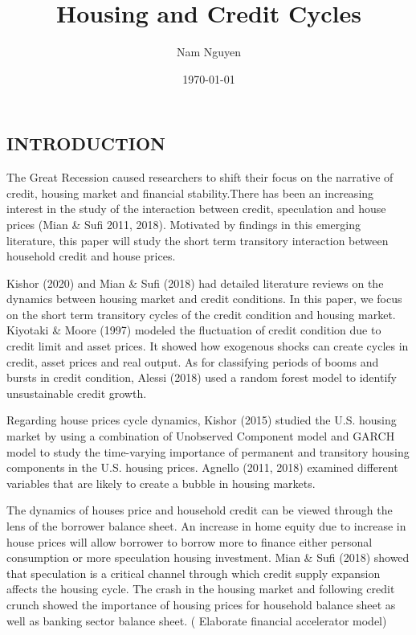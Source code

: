 \documentclass[12pt]{article}
\title{Housing and Credit Cycles}
\author{Nam Nguyen}
\date{\today}
\begin{document}
	\maketitle
	
	\begin{outline}[enumerate]
		
		\section{INTRODUCTION}
	
		The Great Recession caused researchers to shift their focus on the narrative of credit, housing market and financial stability.There has been an increasing interest in the study of the interaction between credit, speculation and house prices (Mian \& Sufi 2011, 2018).  Motivated by findings in this emerging literature, this paper will study the short term transitory interaction between household credit and house prices.
		
		Kishor (2020) and Mian \& Sufi (2018) had detailed literature reviews on the dynamics between housing market and credit conditions. In this paper, we focus on the short term transitory cycles of the credit condition and housing market. Kiyotaki \& Moore (1997) modeled the fluctuation of credit condition due to credit limit and asset prices. It showed how exogenous shocks can create cycles in credit, asset prices and real output. As for classifying periods of booms and bursts in credit condition, Alessi (2018) used a random forest model to identify unsustainable credit growth.
		
		Regarding house prices cycle dynamics, Kishor (2015) studied the U.S. housing market by using a combination of Unobserved Component model and GARCH model to study the time-varying importance of permanent and transitory housing components in the U.S. housing prices. Agnello (2011, 2018) examined different variables that are likely to create a bubble in housing markets.
		
		The dynamics of houses price and household credit can be viewed through the lens of the borrower balance sheet. An increase in home equity due to increase in house prices will allow borrower to borrow more to finance either personal consumption or more speculation housing investment. Mian \& Sufi (2018) showed that speculation  is a critical channel through which credit supply expansion affects the housing cycle. The crash in the housing market and following credit crunch showed the importance of housing prices for household balance sheet as well as banking sector balance sheet. ( Elaborate financial accelerator model)
		

\end{outline}
\end{document}
